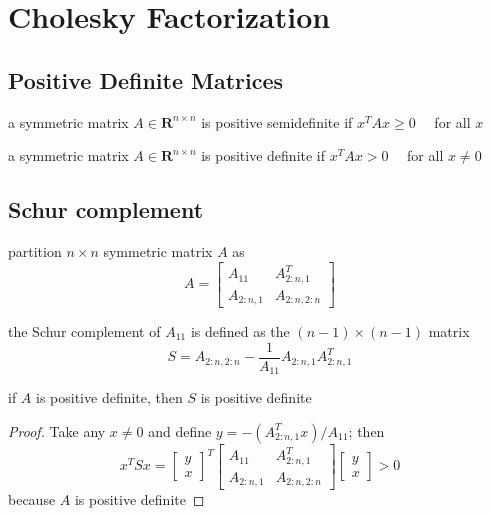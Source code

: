 \chapter{Cholesky Factorization}

\section{Positive Definite Matrices}

\begin{definition}
    a symmetric matrix $ A \in \mathbf{R}^{n \times n} $ is positive semidefinite if $ x^{T} A x \geq 0 \quad $ for all $ x $

\end{definition}

\begin{definition}
    a symmetric matrix $ A \in \mathbf{R}^{n \times n} $ is positive definite if $ x^{T} A x>0 \quad $ for all $ x \neq 0 $
\end{definition}

\section{Schur complement}

\begin{definition}
    partition $ n \times n $ symmetric matrix $ A $ as
$$
A=\left[\begin{array}{cc}
A_{11} & A_{2: n, 1}^{T} \\
A_{2: n, 1} & A_{2: n, 2: n}
\end{array}\right]
$$

the Schur complement of $ A_{11} $ is defined as the $ (n-1) \times(n-1) $ matrix
$$
S=A_{2: n, 2: n}-\frac{1}{A_{11}} A_{2: n, 1} A_{2: n, 1}^{T}
$$
\end{definition}

\begin{theorem}
    if $ A $ is positive definite, then $ S $ is positive definite
\end{theorem}

\begin{proof}
    Take any $ x \neq 0 $ and define $ y=-\left(A_{2: n, 1}^{T} x\right) / A_{11} $; then
$$
x^{T} S x=\left[\begin{array}{l}
y \\
x
\end{array}\right]^{T}\left[\begin{array}{cc}
A_{11} & A_{2: n, 1}^{T} \\
A_{2: n, 1} & A_{2: n, 2: n}
\end{array}\right]\left[\begin{array}{l}
y \\
x
\end{array}\right]>0
$$
because $ A $ is positive definite
\end{proof}

